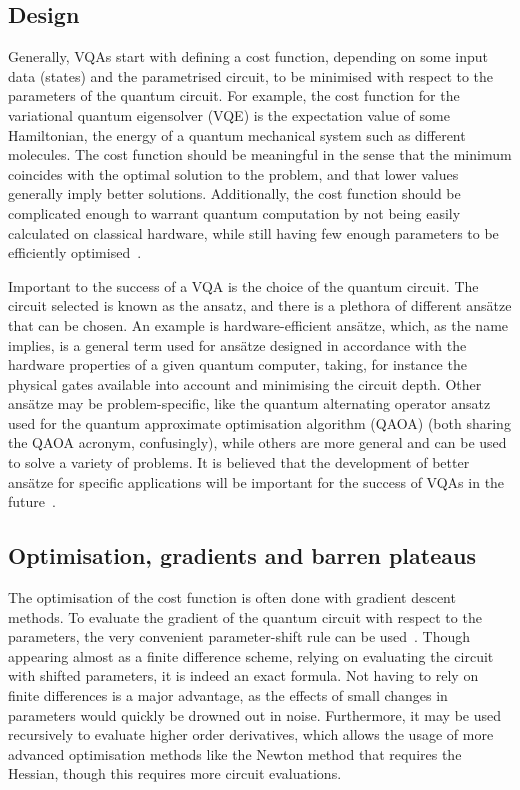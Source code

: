 \subsection{Design}
Generally, VQAs start with defining a cost function, depending on some input data (states) and the parametrised circuit, to be minimised with respect to the parameters of the quantum circuit.
For example, the cost function for the variational quantum eigensolver (VQE) is the expectation value of some Hamiltonian, the energy of a quantum mechanical system such as different molecules.
The cost function should be meaningful in the sense that the minimum coincides with the optimal solution to the problem, and that lower values generally imply better solutions.
Additionally, the cost function should be complicated enough to warrant quantum computation by not being easily calculated on classical hardware, while still having few enough parameters to be efficiently optimised~\autocite{cerezo2021}.

Important to the success of a VQA is the choice of the quantum circuit.
The circuit selected is known as the ansatz, and there is a plethora of different ansätze that can be chosen.
An example is hardware-efficient ansätze, which, as the name implies, is a general term used for ansätze designed in accordance with the hardware properties of a given quantum computer, taking, for instance the physical gates available into account and minimising the circuit depth.
Other ansätze may be problem-specific, like the quantum alternating operator ansatz used for the quantum approximate optimisation algorithm (QAOA) (both sharing the QAOA acronym, confusingly), while others are more general and can be used to solve a variety of problems.
It is believed that the development of better ansätze for specific applications will be important for the success of VQAs in the future~\autocite{cerezo2021}.

\subsection{Optimisation, gradients and barren plateaus}
The optimisation of the cost function is often done with gradient descent methods.
To evaluate the gradient of the quantum circuit with respect to the parameters, the very convenient parameter-shift rule can be used~\autocite{schuld2019}.
Though appearing almost as a finite difference scheme, relying on evaluating the circuit with shifted parameters, it is indeed an exact formula.
Not having to rely on finite differences is a major advantage, as the effects of small changes in parameters would quickly be drowned out in noise.
Furthermore, it may be used recursively to evaluate higher order derivatives, which allows the usage of more advanced optimisation methods like the Newton method that requires the Hessian, though this requires more circuit evaluations.

